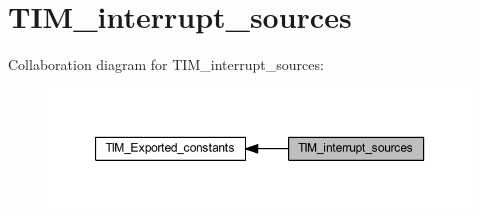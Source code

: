 \hypertarget{group___t_i_m__interrupt__sources}{}\section{T\+I\+M\+\_\+interrupt\+\_\+sources}
\label{group___t_i_m__interrupt__sources}
Collaboration diagram for T\+I\+M\+\_\+interrupt\+\_\+sources\+:
\nopagebreak
\begin{figure}[H]
\begin{center}
\leavevmode
\includegraphics[width=350pt]{group___t_i_m__interrupt__sources}
\end{center}
\end{figure}
